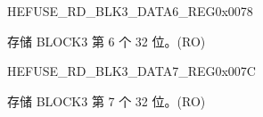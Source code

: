 \begin{register}{H}{EFUSE\_RD\_BLK3\_DATA6\_REG}{0x0078}\label{regdesc:EFUSERDBLK3DATA6REG}
%
\regnewline%
\begin{regdesc}\begin{reglist}
\label{fielddesc:EFUSEBLK3DATA6}\item [EFUSE\_BLK3\_DATA6] 存储 BLOCK3 第 6 个 32 位。(RO)
\end{reglist}\end{regdesc}
\end{register}


\begin{register}{H}{EFUSE\_RD\_BLK3\_DATA7\_REG}{0x007C}\label{regdesc:EFUSERDBLK3DATA7REG}
%
\regnewline%
\begin{regdesc}\begin{reglist}
\label{fielddesc:EFUSEBLK3DATA7}\item [EFUSE\_BLK3\_DATA7] 存储 BLOCK3 第 7 个 32 位。(RO)
\end{reglist}\end{regdesc}
\end{register}


